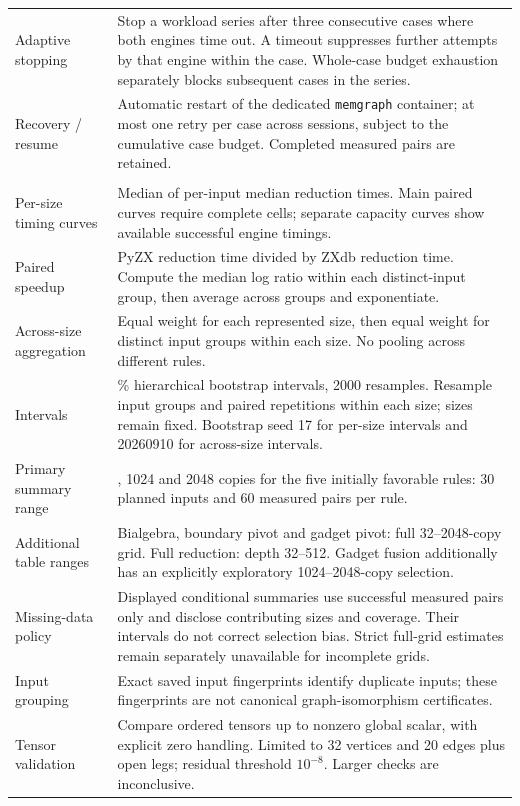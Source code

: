 \begin{longtable}{@{}>{\raggedright\arraybackslash}p{}>{\raggedright\arraybackslash}p{}@{}}
Adaptive stopping & Stop a workload series after three consecutive cases where both engines time out. A timeout suppresses further attempts by that engine within the case. Whole-case budget exhaustion separately blocks subsequent cases in the series. \\
Recovery / resume & Automatic restart of the dedicated \texttt{memgraph} container; at most one retry per case across sessions, subject to the cumulative case budget. Completed measured pairs are retained. \\
\hline
\multicolumn{2}{l}{\textbf{Aggregation and correctness evidence}} \\
Per-size timing curves & Median of per-input median reduction times. Main paired curves require complete cells; separate capacity curves show available successful engine timings. \\
Paired speedup & PyZX reduction time divided by ZXdb reduction time. Compute the median log ratio within each distinct-input group, then average across groups and exponentiate. \\
Across-size aggregation & Equal weight for each represented size, then equal weight for distinct input groups within each size. No pooling across different rules. \\
Intervals & 95\% hierarchical bootstrap intervals, 2000 resamples. Resample input groups and paired repetitions within each size; sizes remain fixed. Bootstrap seed 17 for per-size intervals and 20260910 for across-size intervals. \\
Primary summary range & 512, 1024 and 2048 copies for the five initially favorable rules: 30 planned inputs and 60 measured pairs per rule. \\
Additional table ranges & Bialgebra, boundary pivot and gadget pivot: full 32--2048-copy grid. Full reduction: depth 32--512. Gadget fusion additionally has an explicitly exploratory 1024--2048-copy selection. \\
Missing-data policy & Displayed conditional summaries use successful measured pairs only and disclose contributing sizes and coverage. Their intervals do not correct selection bias. Strict full-grid estimates remain separately unavailable for incomplete grids. \\
Input grouping & Exact saved input fingerprints identify duplicate inputs; these fingerprints are not canonical graph-isomorphism certificates. \\
Tensor validation & Compare ordered tensors up to nonzero global scalar, with explicit zero handling. Limited to 32 vertices and 20 edges plus open legs; residual threshold $10^{-8}$. Larger checks are inconclusive. \\

\end{longtable}
